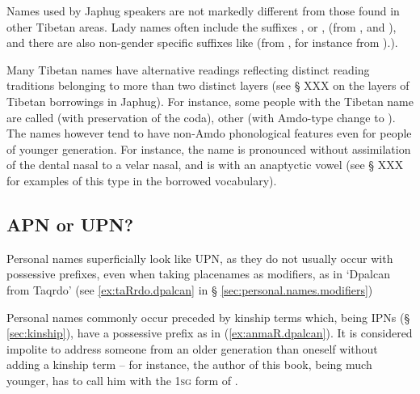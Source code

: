 Names used by Japhug speakers are not markedly different from those found in other Tibetan areas. Lady names often include the suffixes ,  or , (from ,  and ), and there are also non-gender specific suffixes like  (from , for instance  from ).). 

Many Tibetan names have alternative readings reflecting distinct reading traditions belonging to more than two distinct layers (see § XXX on the layers of Tibetan borrowings in Japhug). For instance, some people with the Tibetan name  are called  (with preservation of the coda), other  (with Amdo-type change to ). The names however tend to have non-Amdo phonological features even for people of younger generation. For instance, the name  is pronounced  without assimilation of the dental nasal to a velar nasal, and   is  with an anaptyctic vowel (see § XXX for examples of this type in the borrowed vocabulary).  


 

\subsection{APN or UPN?} \label{sec:personal.name.APN}
Personal names superficially look like UPN, as they do not usually occur with possessive prefixes, even when taking placenames as modifiers, as in  `Dpalcan from Taqrdo' (see \ref{ex:taRrdo.dpalcan} in § \ref{sec:personal.names.modifiers})

Personal names commonly occur preceded by kinship terms which, being IPNs (§ \ref{sec:kinship}), have a possessive prefix as in (\ref{ex:anmaR.dpalcan}). It is considered impolite to address someone from an older generation than oneself without adding a kinship term -- for instance, the author of this book, being much younger, has to call him  with the \textsc{1sg} form of .

